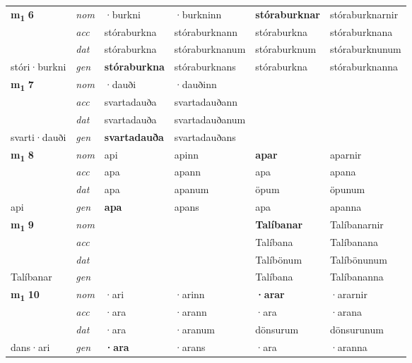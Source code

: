\begin{longtable}[l]{X>{\footnotesize\itshape}XXXXX}
\multirow{3}{*}{{{\textbf{m{\textsubscript{1}}} \Large{\textbf{6}}}}} & nom & ·burkni & ·burkninn & \textbf{stóraburknar} & stóraburknarnir \\*
 & acc & stóraburkna & stóraburknann & stóraburkna & stóraburknana \\*
 & dat & stóraburkna & stóraburknanum & stóraburknum & stóraburknunum \\*
 {\footnotesize{stóri\allowbreak ·burkni}} & gen & \textbf{stóraburkna} & stóraburknans & stóraburkna & stóraburknanna \\
\cmidrule{1-6}

\multirow{3}{*}{{{\textbf{m{\textsubscript{1}}} \Large{\textbf{7}}}}} & nom & ·dauði & ·dauðinn & \textbf{} &  \\*
 & acc & svartadauða & svartadauðann &  &  \\*
 & dat & svartadauða & svartadauðanum &  &  \\*
 {\footnotesize{svarti\allowbreak ·dauði}} & gen & \textbf{svartadauða} & svartadauðans &  &  \\
\cmidrule{1-6}

\multirow{3}{*}{{{\textbf{m{\textsubscript{1}}} \Large{\textbf{8}}}}} & nom & api & apinn & \textbf{apar} & aparnir \\*
 & acc & apa & apann & apa & apana \\*
 & dat & apa & apanum & öpum & öpunum \\*
 {\footnotesize{api}} & gen & \textbf{apa} & apans & apa & apanna \\
\cmidrule{1-6}

\multirow{3}{*}{{{\textbf{m{\textsubscript{1}}} \Large{\textbf{9}}}}} & nom &  &  & \textbf{Talíbanar} & Talíbanarnir \\*
 & acc &  &  & Talíbana & Talíbanana \\*
 & dat &  &  & Talíbönum & Talíbönunum \\*
 {\footnotesize{Talíbanar}} & gen & \textbf{} &  & Talíbana & Talíbananna \\
\cmidrule{1-6}

\multirow{3}{*}{{{\textbf{m{\textsubscript{1}}} \Large{\textbf{10}}}}} & nom & ·ari & ·arinn & \textbf{·arar} & ·ararnir \\*
 & acc & ·ara & ·arann & ·ara & ·arana \\*
 & dat & ·ara & ·aranum & dönsurum & dönsurunum \\*
 {\footnotesize{dans\allowbreak ·ari}} & gen & \textbf{·ara} & ·arans & ·ara & ·aranna \\
\cmidrule{1-6}


\end{longtable}
